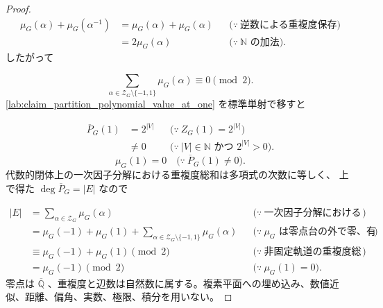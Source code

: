 \documentclass[11pt,a4paper]{article}
\theoremstyle{remark}
\begin{document}
\begin{proof}
\[\begin{aligned}
\mu_G(\alpha)+\mu_G(\alpha^{-1})
&=\mu_G(\alpha)+\mu_G(\alpha)
&&\bigl(\because\ \text{逆数による重複度保存}\bigr)\\
&=2\mu_G(\alpha)
&&\bigl(\because\ \mathbb N\text{ の加法}\bigr).
\end{aligned}\]
したがって

\[\sum_{\alpha\in\mathcal Z_G\setminus\{-1,1\}}\mu_G(\alpha)
\equiv0\pmod2.\]
\cref{lab:claim_partition_polynomial_value_at_one}
 を標準単射で移すと

\[\begin{aligned}
\overline P_G(1)
&=2^{|V|}
&&\bigl(\because\ Z_G(1)=2^{|V|}\bigr)\\
&\ne0
&&\bigl(\because\ |V|\in\mathbb N\text{ かつ }2^{|V|}>0\bigr).
\end{aligned}\]
\[\mu_G(1)=0
\quad\bigl(\because\ \overline P_G(1)\ne0\bigr).\]
代数的閉体上の一次因子分解における重複度総和は多項式の次数に等しく、
上で得た 
$\deg\overline P_G=|E|$
 なので

\[\begin{aligned}
|E|
&=\sum_{\alpha\in\mathcal Z_G}\mu_G(\alpha)
&&\bigl(\because\ \text{一次因子分解における重複度総和}\bigr)\\
&=\mu_G(-1)+\mu_G(1)
  +\sum_{\alpha\in\mathcal Z_G\setminus\{-1,1\}}\mu_G(\alpha)
&&\bigl(\because\ \mu_G\text{ は零点台の外で零、有限零点台を三部分へ分割}\bigr)\\
&\equiv\mu_G(-1)+\mu_G(1)\pmod2
&&\bigl(\because\ \text{非固定軌道の重複度総和は偶数}\bigr)\\
&=\mu_G(-1)\pmod2
&&\bigl(\because\ \mu_G(1)=0\bigr).
\end{aligned}\]
零点は 
$\overline{\mathbb Q}$
、重複度と辺数は自然数に属する。複素平面への埋め込み、数値近似、距離、偏角、実数、極限、積分を用いない。

\end{proof}
\end{document}
